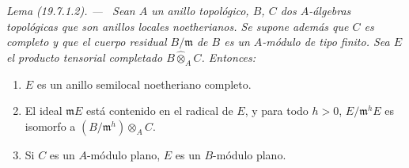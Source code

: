 \documentclass[10pt,oneside]{book}
\makeatletter
\newcommand{\setmanualcurrentlabel}[1]{\def\@currentlabel{#1}}
\newenvironment{lemma}[1][]{%
  \setmanualcurrentlabel{#1}\par\medskip\noindent\itshape Lema (#1). ---\ }{\par}
\makeatother
\begin{document}
\begin{lemma}[19.7.1.2]
\label{0.19.7.1.2-es}
Sean $A$ un anillo topológico, $B$, $C$ dos $A$-álgebras topológicas que
son anillos locales noetherianos. Se supone además que $C$ es completo
y que el cuerpo residual $B/\mathfrak m$ de $B$ es un $A$-módulo de tipo finito.
Sea $E$ el producto tensorial completado $B\widehat\otimes_A C$. Entonces:
\begin{enumerate}
  \item[\textup{(i)}] $E$ es un anillo semilocal noetheriano completo.
  \item[\textup{(ii)}] El ideal $\mathfrak mE$ está contenido en el radical de $E$, y
  para todo $h>0$, $E/\mathfrak m^hE$ es isomorfo a
  $(B/\mathfrak m^h)\otimes_A C$.
  \item[\textup{(iii)}] Si $C$ es un $A$-módulo plano, $E$ es un $B$-módulo plano.
\end{enumerate}
\end{lemma}
\end{document}
